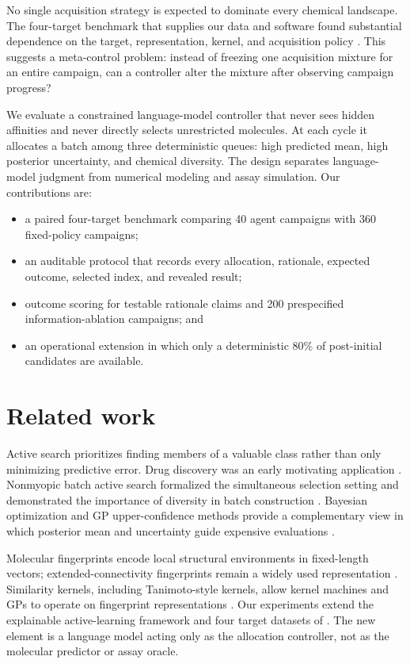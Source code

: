 \documentclass{article}
\begin{document}
No single acquisition strategy is expected to dominate every chemical landscape. The four-target benchmark that supplies our data and software found substantial dependence on the target, representation, kernel, and acquisition policy \citep{srivastava2026explainable}. This suggests a meta-control problem: instead of freezing one acquisition mixture for an entire campaign, can a controller alter the mixture after observing campaign progress?

We evaluate a constrained language-model controller that never sees hidden affinities and never directly selects unrestricted molecules. At each cycle it allocates a batch among three deterministic queues: high predicted mean, high posterior uncertainty, and chemical diversity. The design separates language-model judgment from numerical modeling and assay simulation. Our contributions are:

\begin{itemize}[leftmargin=*,nosep]
    \item a paired four-target benchmark comparing 40 agent campaigns with 360 fixed-policy campaigns;
    \item an auditable protocol that records every allocation, rationale, expected outcome, selected index, and revealed result;
    \item outcome scoring for testable rationale claims and 200 prespecified information-ablation campaigns; and
    \item an operational extension in which only a deterministic 80\% of post-initial candidates are available.
\end{itemize}

\section{Related work}

Active search prioritizes finding members of a valuable class rather than only minimizing predictive error. Drug discovery was an early motivating application \citep{warmuth2001active}. Nonmyopic batch active search formalized the simultaneous selection setting and demonstrated the importance of diversity in batch construction \citep{jiang2018batch}. Bayesian optimization and GP upper-confidence methods provide a complementary view in which posterior mean and uncertainty guide expensive evaluations \citep{srinivas2010gpucb}.

Molecular fingerprints encode local structural environments in fixed-length vectors; extended-connectivity fingerprints remain a widely used representation \citep{rogers2010ecfp}. Similarity kernels, including Tanimoto-style kernels, allow kernel machines and GPs to operate on fingerprint representations \citep{ralaivola2005kernels}. Our experiments extend the explainable active-learning framework and four target datasets of \citet{srivastava2026explainable}. The new element is a language model acting only as the allocation controller, not as the molecular predictor or assay oracle.
\end{document}
